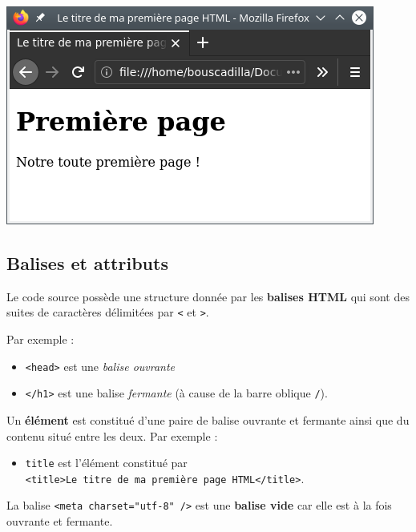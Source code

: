 \documentclass[a4paper,17pt]{extarticle}
\makeatletter
\let\origfigure\figure
\let\endorigfigure\endfigure
\renewenvironment{figure}[1][2] {
    \expandafter\origfigure\expandafter[H]
} {
    \endorigfigure
}
\def\maxwidth{\ifdim\Gin@nat@width>\linewidth\linewidth
    \else\Gin@nat@width\fi}
\let\Oldincludegraphics\includegraphics
\renewcommand{\includegraphics}[1]{\Oldincludegraphics[width=.8\maxwidth]{#1}}
\providecommand{\tightlist}{%
      \setlength{\itemsep}{0pt}\setlength{\parskip}{0pt}}
\makeatother
\begin{document}
\begin{reponse}
\begin{figure}
\centering
\includegraphics{res/premier_exemple.png}
\caption{Capture d'écran du premier exemple}
\end{figure}

            \end{reponse}
    \hypertarget{balises-et-attributs}{%
\subsection{Balises et attributs}\label{balises-et-attributs}}

    Le code source possède une structure donnée par les \textbf{balises
HTML} qui sont des suites de caractères délimitées par
\texttt{\textless{}} et \texttt{\textgreater{}}.

Par exemple :

\begin{itemize}
\tightlist
\item
  \texttt{\textless{}head\textgreater{}} est une \emph{balise ouvrante}
\item
  \texttt{\textless{}/h1\textgreater{}} est une balise \emph{fermante}
  (à cause de la barre oblique \texttt{/}).
\end{itemize}

Un \textbf{élément} est constitué d'une paire de balise ouvrante et
fermante ainsi que du contenu situé entre les deux. Par exemple :

\begin{itemize}
\tightlist
\item
  \texttt{title} est l'élément constitué par
  \texttt{\textless{}title\textgreater{}Le\ titre\ de\ ma\ première\ page\ HTML\textless{}/title\textgreater{}}.
\end{itemize}

La balise \texttt{\textless{}meta\ charset="utf-8"\ /\textgreater{}} est
une \textbf{balise vide} car elle est à la fois ouvrante et fermante.
\end{document}
